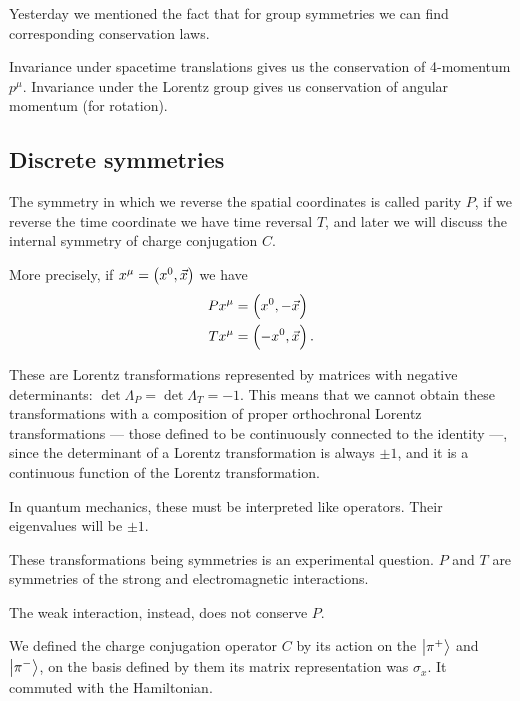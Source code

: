 \documentclass[main.tex]{subfiles}
\begin{document}

Yesterday we mentioned the fact that for group symmetries we can find corresponding conservation laws. 

Invariance under spacetime translations gives us the conservation of 4-momentum \(p^{\mu }\). 
Invariance under the Lorentz group gives us conservation of angular momentum (for rotation).


\subsection{Discrete symmetries}

The symmetry in which we reverse the spatial coordinates is called parity \(P\), if we reverse the time coordinate we have time reversal \(T\), and later we will discuss the internal symmetry of charge conjugation \(C\).

More precisely, if \(x^{\mu } = \qty( x^{0}, \vec{x} )\) we have 
%
\begin{subequations}
\begin{align}
P x^{\mu } &= \qty(x^{0}, - \vec{x})  \\
T x^{\mu } &= \qty(-x^{0}, \vec{x})
\,.
\end{align}
\end{subequations}

These are Lorentz transformations represented by matrices with negative determinants: \(\det \Lambda_{P} = \det \Lambda_{T} = -1\). 
This means that we cannot obtain these transformations with a composition of proper orthochronal Lorentz transformations --- those defined to be continuously connected to the identity ---, since the determinant of a Lorentz transformation is always \(\pm 1\), and it is a continuous function of the Lorentz transformation. 

In quantum mechanics, these must be interpreted like operators. 
Their eigenvalues will be \(\pm 1\). 

These transformations being symmetries is an experimental question. \(P\) and \(T\) are symmetries of the strong and electromagnetic interactions. 

The weak interaction, instead, does not conserve \(P\). 

We defined the charge conjugation operator \(C\) by its action on the \(\ket{\pi^{+}}\) and \(\ket{\pi^{-}}\), on the basis defined by them its matrix representation was \(\sigma_{x}\). 
It commuted with the Hamiltonian. 
\end{document}
